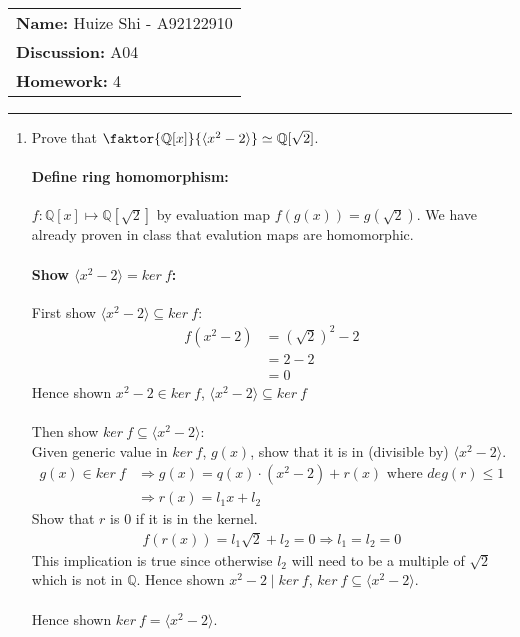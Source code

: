 \documentclass[12pt]{article}
\begin{document}
\null\hfill\begin{tabular}[t]{l@{}}
	\textbf{Name: }Huize Shi - A92122910 \\
	\textbf{Discussion: }A04 \\
	\textbf{Homework: }4
\end{tabular}
\noindent\rule{\textwidth}{0.5pt}

\begin{enumerate}
	\item Prove that $\faktor{\mathbb{Q}[x]}{\langle x^2-2 \rangle} \simeq
		\mathbb{Q}[\sqrt{2}]$.
		\paragraph{Define ring homomorphism:}$f:\mathbb{Q}[x] \mapsto
		\mathbb{Q}[\sqrt{2}]$ by evaluation map $f(g(x)) = g(\sqrt{2})$. We have
		already proven in class that evalution maps are homomorphic.

		\paragraph{Show $\langle x^2-2 \rangle = ker\ f$:}$\ $\\
		First show $\langle x^2-2 \rangle \subseteq ker\ f$:
			\begin{align*}
				f(x^2-2) &= (\sqrt{2})^2 - 2\\
								 &= 2-2\\
								 &= 0
			\end{align*}
			Hence shown $x^2-2 \in ker\ f$, $\langle x^2-2 \rangle \subseteq ker\
			f$\\\\

		Then show $ker\ f \subseteq \langle x^2-2 \rangle$: \\
		Given generic value in $ker\ f$, $g(x)$, show that it is in (divisible by)
		$\langle x^2-2 \rangle$.
		\begin{align*}
			g(x) \in ker\ f &\Rightarrow g(x)=q(x)\cdot(x^2-2) + r(x) \text{ where
			$deg(r) \le 1$}\\
			&\Rightarrow r(x) = l_1x+l_2
		\end{align*}
		Show that $r$ is $0$ if it is in the kernel.
		\begin{align*}
			f(r(x)) = l_1\sqrt{2} + l_2 = 0 \Rightarrow l_1=l_2=0
		\end{align*} 
		This implication is true since otherwise $l_2$ will need to be a multiple
		of $\sqrt{2}$ which is not in $\mathbb{Q}$. Hence shown $x^2-2 \mid ker\
		f$, $ker\ f \subseteq \langle x^2-2 \rangle$.\\\\
	  Hence shown $ker\ f=\langle x^2-2 \rangle$.


\end{enumerate}
\end{document}
